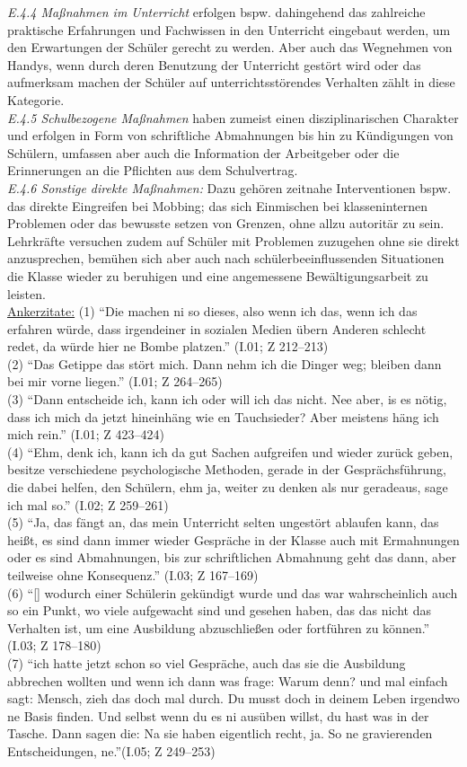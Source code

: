 \textit{E.4.4 Maßnahmen im Unterricht} erfolgen bspw. dahingehend das zahlreiche praktische Erfahrungen und Fachwissen in den Unterricht eingebaut werden, um den Erwartungen der Schüler gerecht zu werden. Aber auch das Wegnehmen von Handys, wenn durch deren Benutzung der Unterricht gestört wird oder das aufmerksam machen der Schüler auf unterrichtsstörendes Verhalten zählt in diese Kategorie.\\
\textit{E.4.5 Schulbezogene Maßnahmen} haben zumeist einen disziplinarischen Charakter und erfolgen in Form von schriftliche Abmahnungen bis hin zu Kündigungen von Schülern, umfassen aber auch die Information der Arbeitgeber oder die Erinnerungen an die Pflichten aus dem Schulvertrag.\\
\textit{E.4.6 Sonstige direkte Maßnahmen:} Dazu gehören zeitnahe Interventionen bspw. das direkte Eingreifen bei Mobbing; das sich Einmischen bei klasseninternen Problemen oder das bewusste setzen von Grenzen, ohne allzu autoritär zu sein. Lehrkräfte versuchen zudem auf Schüler mit Problemen zuzugehen ohne sie direkt anzusprechen, bemühen sich aber auch nach schülerbeeinflussenden Situationen die Klasse wieder zu beruhigen und eine angemessene Bewältigungsarbeit zu leisten.\\
\underline{Ankerzitate:} (1) "`Die machen ni so dieses, also wenn ich das, wenn ich das erfahren würde, dass irgendeiner in sozialen Medien übern Anderen schlecht redet, da würde hier ne Bombe platzen."' (I.01; Z 212--213)\\ (2) "`Das Getippe das stört mich. Dann nehm ich die Dinger weg; bleiben dann bei mir vorne liegen."' (I.01; Z 264--265)\\ (3) "`Dann entscheide ich, kann ich oder will ich das nicht. Nee aber, is es nötig, dass ich mich da jetzt hineinhäng wie en Tauchsieder? Aber meistens häng ich mich rein."' (I.01; Z 423--424)\\ (4) "`Ehm, denk ich, kann ich da gut Sachen aufgreifen und wieder zurück geben, besitze verschiedene psychologische Methoden, gerade in der Gesprächsführung, die dabei helfen, den Schülern, ehm ja, weiter zu denken als nur geradeaus, sage ich mal so."' (I.02; Z 259--261)\\ (5) "`Ja, das fängt an, das mein Unterricht selten ungestört ablaufen kann, das heißt, es sind dann immer wieder Gespräche in der Klasse auch mit Ermahnungen oder es sind Abmahnungen, bis zur schriftlichen Abmahnung geht das dann, aber teilweise ohne Konsequenz."' (I.03; Z 167--169)\\ (6) "`[\punkte] wodurch einer Schülerin gekündigt wurde und das war wahrscheinlich auch so ein Punkt, wo viele aufgewacht sind und gesehen haben, das das nicht das Verhalten ist, um eine Ausbildung abzuschließen oder fortführen zu können."' (I.03; Z 178--180)\\ (7) "`ich hatte jetzt schon so viel Gespräche, auch das sie die Ausbildung abbrechen wollten und wenn ich dann was frage: Warum denn? und mal einfach sagt: Mensch, zieh das doch mal durch. Du musst doch in deinem Leben irgendwo ne Basis finden. Und selbst wenn du es ni ausüben willst, du hast was in der Tasche. Dann sagen die: Na sie haben eigentlich recht, ja. So ne gravierenden Entscheidungen, ne."'(I.05; Z 249--253)\\
